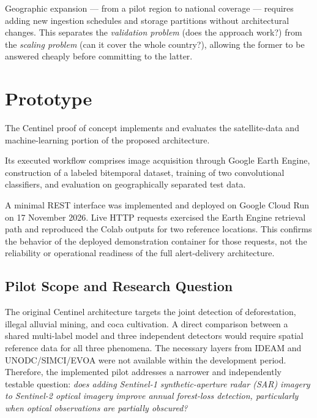 \documentclass{article}
\begin{document}
Geographic expansion --- from a pilot region to national coverage --- requires
adding new ingestion schedules and storage partitions without architectural
changes.
This separates the \textit{validation problem} (does the approach work?) from
the \textit{scaling problem} (can it cover the whole country?), allowing the
former to be answered cheaply before committing to the latter.



\section{Prototype}
\label{sec:prototype}

The Centinel proof of concept implements and evaluates the satellite-data and machine-learning portion of the proposed architecture. 

Its executed workflow comprises image acquisition through Google Earth Engine, construction of a labeled bitemporal dataset, training of two convolutional classifiers, and evaluation on geographically separated test data. 

A minimal REST interface was implemented and deployed on Google Cloud Run on 17 November 2026. Live HTTP requests exercised the Earth Engine retrieval path and reproduced the Colab outputs for two reference locations. This confirms the behavior of the deployed demonstration container for those requests, not the reliability or operational readiness of the full alert-delivery architecture.

\subsection{Pilot Scope and Research Question}
\label{subsec:prototype-scope}

The original Centinel architecture targets the joint detection of deforestation, illegal alluvial mining, and coca cultivation. A direct comparison between a shared multi-label model and three independent detectors would require spatial reference data for all three phenomena. The necessary layers from IDEAM and UNODC/SIMCI/EVOA were not available within the development period. Therefore, the implemented pilot addresses a narrower and independently testable question: \emph{does adding Sentinel-1 synthetic-aperture radar (SAR) imagery to Sentinel-2 optical imagery improve annual forest-loss detection, particularly when optical observations are partially obscured?}
\end{document}
